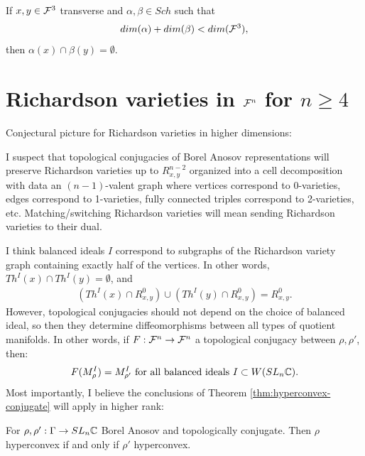 \begin{remark} 
    If $x,y \in \mathcal{F}^3$ transverse and $\alpha,\beta \in Sch$ such that 
    \begin{align}
        dim(\alpha)+dim(\beta) < dim(\mathcal{F}^3),
    \end{align}
    then $\alpha(x) \cap \beta(y) = \emptyset$.
\end{remark}

\section{Richardson varieties in $\mathcal{F}^{n}$ for $n\geq 4$}

Conjectural picture for Richardson varieties in higher dimensions:

I suspect that topological conjugacies of Borel Anosov representations will preserve 
Richardson varieties up to $R^{n-2}_{x,y}$ organized into a cell decomposition with data an 
$(n-1)$-valent graph where vertices correspond to 0-varieties, edges correspond to 1-varieties,
fully connected triples correspond to 2-varieties, etc. 
Matching/switching Richardson varieties will mean sending Richardson varieties to their dual.

I think balanced ideals $I$ correspond to subgraphs of the Richardson variety graph 
containing exactly half of the vertices. In other words, $Th^I(x) \cap Th^I(y) = \emptyset$, and
\begin{align}
    (Th^I(x) \cap R^0_{x,y}) \cup (Th^I(y) \cap R^0_{x,y}) = R^0_{x,y}.
\end{align}
However, topological conjugacies should not depend on the choice of balanced ideal, 
so then they determine diffeomorphisms between all types of quotient manifolds. 
In other words, if $F:\mathcal{F}^n \rightarrow \mathcal{F}^n$ a topological conjugacy between $\rho, \rho'$, then:
\begin{align}
    F(M^I_\rho) = M^I_{\rho'} \text{ for all balanced ideals } I \subset W(SL_n\mathbb{C}).
\end{align}
Most importantly, I believe the conclusions of Theorem \ref{thm:hyperconvex-conjugate} will apply in higher rank:
\begin{conjecture}
    For $\rho,\rho':\Gamma \rightarrow SL_n\mathbb{C}$ Borel Anosov and topologically conjugate. 
    Then $\rho$ hyperconvex if and only if $\rho'$ hyperconvex. 
\end{conjecture}